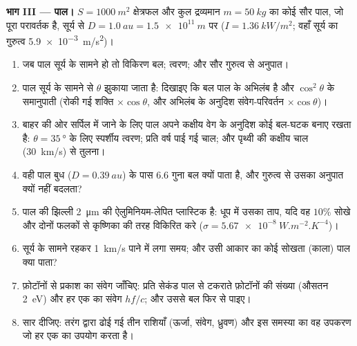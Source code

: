 \begin{problem}
\medskip
\noindent\textbf{भाग III --- पाल।}
$S = \qty{1000}{m^2}$ क्षेत्रफल और कुल द्रव्यमान $m = \qty{50}{kg}$ का कोई सौर पाल,
जो पूरा परावर्तक है, सूर्य से $D = \qty{1.0}{au} = \qty{1.5e11}{m}$ पर
($I = \qty{1.36}{kW/m^2}$; वहाँ सूर्य का गुरुत्व \qty{5.9e-3}{m/s^2})।
\begin{enumerate}[resume]
  \item जब पाल सूर्य के सामने हो तो विकिरण बल; त्वरण;
        और सौर गुरुत्व से अनुपात।
  \item पाल सूर्य के सामने से $\theta$ झुकाया जाता है: दिखाइए कि
        बल पाल के अभिलंब है और $\cos^2\theta$ के समानुपाती
        (रोकी गई शक्ति $\times\cos\theta$, और अभिलंब के अनुदिश संवेग-परिवर्तन
        $\times\cos\theta$)।
  \item बाहर की ओर सर्पिल में जाने के लिए पाल अपने कक्षीय वेग के अनुदिश
        कोई बल-घटक बनाए रखता है: $\theta = \qty{35}{\degree}$ के लिए स्पर्शीय
        त्वरण; प्रति वर्ष पाई गई चाल; और पृथ्वी की
        कक्षीय चाल (\qty{30}{km/s}) से तुलना।
  \item वही पाल बुध ($D = \qty{0.39}{au}$) के पास $6.6$ गुना बल क्यों पाता
        है, और गुरुत्व से उसका अनुपात क्यों नहीं बदलता?
  \item पाल की झिल्ली \qty{2}{\micro m} की ऐलुमिनियम-लेपित प्लास्टिक है: धूप में
        उसका ताप, यदि वह $10\%$ सोखे और दोनों फलकों से
        कृष्णिका की तरह विकिरित करे ($\sigma = \qty{5.67e-8}{W.m^{-2}.K^{-4}}$)।
  \item सूर्य के सामने रहकर \qty{1}{km/s} पाने में लगा समय; और उसी आकार
        का कोई सोखता (काला) पाल क्या पाता?
  \item फ़ोटॉनों से प्रकाश का संवेग जाँचिए: प्रति सेकंड पाल से टकराते
        फ़ोटॉनों की संख्या (औसतन \qty{2}{eV}) और हर एक का
        संवेग $hf/c$; और उससे बल फिर से पाइए।
  \item सार दीजिए: तरंग द्वारा ढोई गई तीन राशियाँ (ऊर्जा,
        संवेग, ध्रुवण) और इस समस्या का वह उपकरण जो हर एक का
        उपयोग करता है।
\end{enumerate}
\end{problem}
